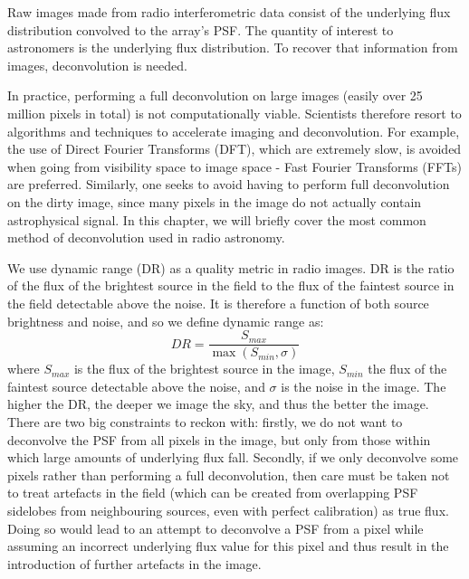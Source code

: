 \pg
Raw images made from radio interferometric data consist of the underlying flux distribution convolved to the array's PSF. The quantity of interest to astronomers is the underlying flux distribution. To recover that information from images, deconvolution is needed.

\pg
In practice, performing a full deconvolution on large images (easily over 25 million pixels in total) is not computationally viable. Scientists therefore resort to algorithms and techniques to accelerate imaging and deconvolution. For example, the use of Direct Fourier Transforms (DFT), which are extremely slow, is avoided when going from visibility space to image space - Fast Fourier Transforms (FFTs) are preferred. Similarly, one seeks to avoid having to perform full deconvolution on the dirty image, since many pixels in the image do not actually contain astrophysical signal. In this chapter, we will briefly cover the most common method of deconvolution used in radio astronomy.

\pg
We use dynamic range (DR) as a quality metric in radio images. DR is the ratio of the flux of the brightest source in the field to the flux of the faintest source in the field detectable above the noise. It is therefore a function of both source brightness and noise, and so we define dynamic range as:
\begin{equation}\label{eq.DR.imag}
DR = \frac{S_{max}}{\max(S_{min},\sigma)}
\end{equation}
where $S_{max}$ is the flux of the brightest source in the image, $S_{min}$ the flux of the faintest source detectable above the noise, and $\sigma$ is the noise in the image. The higher the DR, the deeper we image the sky, and thus the better the image. There are two big constraints to reckon with: firstly, we do not want to deconvolve the PSF from all pixels in the image, but only from those within which large amounts of underlying flux fall. Secondly, if we only deconvolve some pixels rather than performing a full deconvolution, then care must be taken not to treat artefacts in the field (which can be created from overlapping PSF sidelobes from neighbouring sources, even with perfect calibration) as true flux. Doing so would lead to an attempt to deconvolve a PSF from a pixel while assuming an incorrect underlying flux value for this pixel and thus result in the introduction of further artefacts in the image.


